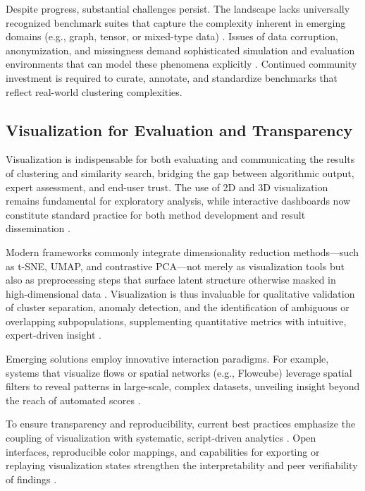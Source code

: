 Despite progress, substantial challenges persist. The landscape lacks universally recognized benchmark suites that capture the complexity inherent in emerging domains (e.g., graph, tensor, or mixed-type data) \cite{ref27, ref28, ref36, ref46, ref110}. Issues of data corruption, anonymization, and missingness demand sophisticated simulation and evaluation environments that can model these phenomena explicitly \cite{ref94, ref95, ref96, ref99}. Continued community investment is required to curate, annotate, and standardize benchmarks that reflect real-world clustering complexities.

\subsection{Visualization for Evaluation and Transparency}

Visualization is indispensable for both evaluating and communicating the results of clustering and similarity search, bridging the gap between algorithmic output, expert assessment, and end-user trust. The use of 2D and 3D visualization remains fundamental for exploratory analysis, while interactive dashboards now constitute standard practice for both method development and result dissemination \cite{ref53,ref58,ref79,ref86,ref91,ref92,ref94,ref95,ref99,ref115}.

Modern frameworks commonly integrate dimensionality reduction methods---such as t-SNE, UMAP, and contrastive PCA---not merely as visualization tools but also as preprocessing steps that surface latent structure otherwise masked in high-dimensional data \cite{ref91,ref92,ref95}. Visualization is thus invaluable for qualitative validation of cluster separation, anomaly detection, and the identification of ambiguous or overlapping subpopulations, supplementing quantitative metrics with intuitive, expert-driven insight \cite{ref58,ref92,ref94,ref95}.

Emerging solutions employ innovative interaction paradigms. For example, systems that visualize flows or spatial networks (e.g., Flowcube) leverage spatial filters to reveal patterns in large-scale, complex datasets, unveiling insight beyond the reach of automated scores \cite{ref53}.

To ensure transparency and reproducibility, current best practices emphasize the coupling of visualization with systematic, script-driven analytics \cite{ref94,ref99,ref115}. Open interfaces, reproducible color mappings, and capabilities for exporting or replaying visualization states strengthen the interpretability and peer verifiability of findings \cite{ref86,ref115}.

